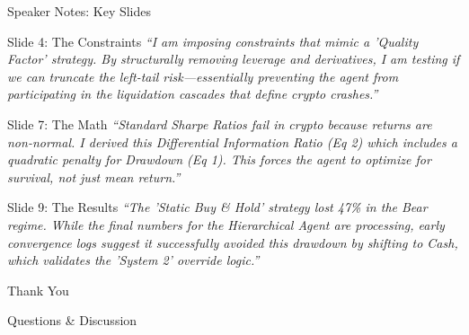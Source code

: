 \documentclass[aspectratio=169]{beamer}
\begin{document}

\appendix

\begin{frame}{Speaker Notes: Key Slides}
\begin{block}{Slide 4: The Constraints}
\textit{``I am imposing constraints that mimic a 'Quality Factor' strategy. By structurally removing leverage and derivatives, I am testing if we can truncate the left-tail risk—essentially preventing the agent from participating in the liquidation cascades that define crypto crashes.''}
\end{block}

\vspace{0.3cm}

\begin{block}{Slide 7: The Math}
\textit{``Standard Sharpe Ratios fail in crypto because returns are non-normal. I derived this Differential Information Ratio (Eq 2) which includes a quadratic penalty for Drawdown (Eq 1). This forces the agent to optimize for survival, not just mean return.''}
\end{block}

\vspace{0.3cm}

\begin{block}{Slide 9: The Results}
\textit{``The 'Static Buy \& Hold' strategy lost 47\% in the Bear regime. While the final numbers for the Hierarchical Agent are processing, early convergence logs suggest it successfully avoided this drawdown by shifting to Cash, which validates the 'System 2' override logic.''}
\end{block}
\end{frame}

\begin{frame}[plain]
\begin{center}
\Huge Thank You
\vspace{1cm}

\Large Questions \& Discussion
\end{center}
\end{frame}
\end{document}
